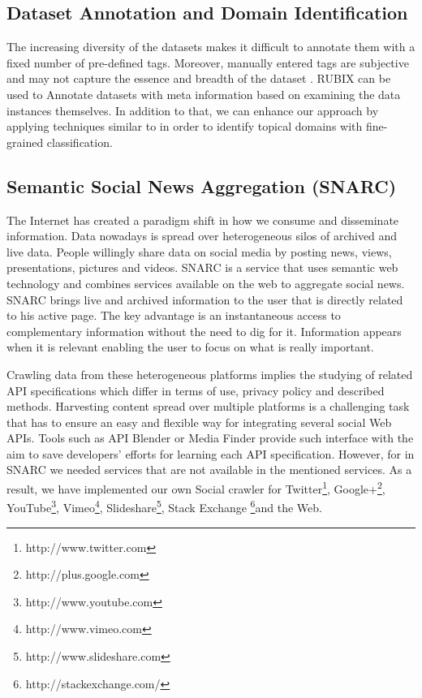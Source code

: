 \documentclass[onecolumn, crcready]{iosart2c}
\begin{document}
\subsection{Dataset Annotation and Domain Identification}

The increasing diversity of the datasets makes it difficult to annotate them with a fixed number of pre-defined tags. Moreover, manually entered tags are subjective and may not capture the essence and breadth of the dataset \cite{AutomaticDomainIdentification}. RUBIX can be used to Annotate datasets with meta information based on examining the data instances themselves. In addition to that, we can enhance our approach by applying techniques similar to \cite{AutomaticDomainIdentification} in order to identify topical domains with fine-grained classification.

\subsection{Semantic Social News Aggregation (SNARC)}

The Internet has created a paradigm shift in how we consume and disseminate information. Data nowadays is spread over heterogeneous silos of archived and live data. People willingly share data on social media by posting news, views, presentations, pictures and videos. SNARC is a service that uses semantic web technology and combines services available on the web to aggregate social news. SNARC brings live and archived information to the user that is directly related to his active page. The key advantage is an instantaneous access to complementary information without the need to dig for it. Information appears when it is relevant enabling the user to focus on what is really important.

Crawling data from these heterogeneous platforms implies the studying of related API specifications which differ in terms of use, privacy policy and described methods. Harvesting content spread over multiple platforms is a challenging task that has to ensure an easy and flexible way for integrating several social Web APIs. Tools such as API Blender \cite{journals/corr/abs-1301-2086} or Media Finder \cite{conf/chi/KangS03} provide such interface with the aim to save developers' efforts for learning each API specification. However, for in SNARC we needed services that are not available in the mentioned services. As a result, we have implemented our own Social crawler for Twitter\footnote{http://www.twitter.com}, Google+\footnote{http://plus.google.com}, YouTube\footnote{http://www.youtube.com}, Vimeo\footnote{http://www.vimeo.com}, Slideshare\footnote{http://www.slideshare.com}, Stack Exchange \footnote{http://stackexchange.com/}and the Web.
\end{document}
